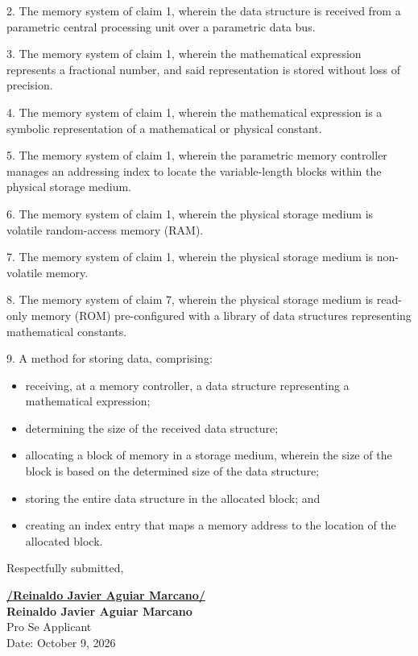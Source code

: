 \documentclass[11pt,letterpaper]{article}
\begin{document}
2. The memory system of claim 1, wherein the data structure is received from a parametric central processing unit over a parametric data bus.

3. The memory system of claim 1, wherein the mathematical expression represents a fractional number, and said representation is stored without loss of precision.

4. The memory system of claim 1, wherein the mathematical expression is a symbolic representation of a mathematical or physical constant.

5. The memory system of claim 1, wherein the parametric memory controller manages an addressing index to locate the variable-length blocks within the physical storage medium.

6. The memory system of claim 1, wherein the physical storage medium is volatile random-access memory (RAM).

7. The memory system of claim 1, wherein the physical storage medium is non-volatile memory.

8. The memory system of claim 7, wherein the physical storage medium is read-only memory (ROM) pre-configured with a library of data structures representing mathematical constants.

9. A method for storing data, comprising:
\begin{itemize}[leftmargin=2.5em]
    \item[] receiving, at a memory controller, a data structure representing a mathematical expression;
    \item[] determining the size of the received data structure;
    \item[] allocating a block of memory in a storage medium, wherein the size of the block is based on the determined size of the data structure;
    \item[] storing the entire data structure in the allocated block; and
    \item[] creating an index entry that maps a memory address to the location of the allocated block.
\end{itemize}

\vspace{1.0cm}
\begin{singlespace}
\noindent Respectfully submitted, \par\vspace{1.2cm}
\underline{\textbf{/Reinaldo Javier Aguiar Marcano/}} \\
\textbf{Reinaldo Javier Aguiar Marcano} \\
Pro Se Applicant \\
Date: October 9, 2026
\end{singlespace}
\end{document}
